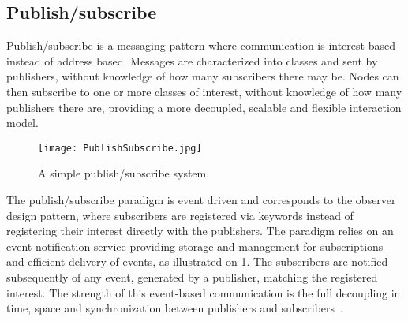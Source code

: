 





\subsection{Publish/subscribe}

Publish/subscribe is a messaging pattern where communication is interest based instead of address based. Messages are characterized into classes and sent by publishers, without knowledge of how many subscribers there may be. Nodes can then subscribe to one or more classes of interest, without knowledge of how many publishers there are, providing a more decoupled, scalable and flexible interaction model.

\begin{figure}
	\centering
	\texttt{[image: PublishSubscribe.jpg]} 
	\caption[Distributed Computing System with 2 nodes]{
		\label{fig:publishSubscribe} 
		\footnotesize{%
			A simple publish/subscribe system.
		}
	}
\end{figure}

The publish/subscribe paradigm is event driven and corresponds to the observer design pattern, where subscribers are registered via keywords instead of registering their interest directly with the publishers. The paradigm relies on an event notification service providing storage and management for subscriptions and efficient delivery of events, as illustrated on \cref{fig:publishSubscribe}. The subscribers are notified subsequently of any event, generated by a publisher, matching the registered interest. The strength of this event-based communication is the full decoupling in time, space and synchronization between publishers and subscribers~\cite{eugster2003many}.

